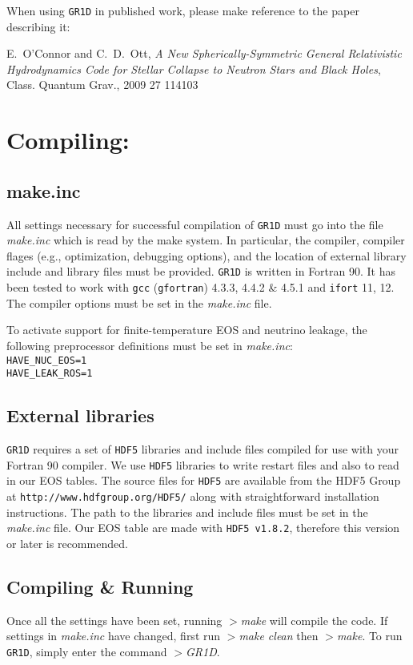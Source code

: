 \documentclass[10pt,nofootinbib]{article}
\newcommand{\code}[1]{\texttt{#1}}
\begin{document}
When using \code{GR1D} in published work, please make reference
to the paper describing it:

\hspace{2cm}\parbox{12cm}{E.\ O'Connor and C.\ D.\ Ott, \emph{A New Spherically-Symmetric
General Relativistic Hydrodynamics Code for Stellar Collapse to Neutron
Stars and Black Holes}, Class. Quantum Grav., 2009 27 114103}

\section{Compiling:}
\subsection{make.inc}
All settings necessary for successful compilation of \code{GR1D} must
go into the file {\emph{make.inc}} which is read by the make
system. In particular, the compiler, compiler flages (e.g.,
optimization, debugging options), and the location of external library
include and library files must be provided. \code{GR1D} is written in
Fortran 90. It has been tested to work with \code{gcc}
(\code{gfortran}) 4.3.3, 4.4.2 \& 4.5.1 and \code{ifort} 11, 12.  The compiler
options must be set in the {\it make.inc} file.

To activate support for finite-temperature EOS and neutrino leakage,
the following preprocessor definitions must be set in \emph{make.inc}:\\
{\tt HAVE\_NUC\_EOS=1}\\
{\tt HAVE\_LEAK\_ROS=1}

\subsection{External libraries}
\code{GR1D} requires a set of \code{HDF5} libraries and include files
compiled for use with your Fortran 90 compiler.  We use
\code{HDF5} libraries to write restart files and also to read in our
EOS tables.  The source files for \code{HDF5} are available from the
HDF5 Group at {\tt http://www.hdfgroup.org/HDF5/} along with
straightforward installation instructions.  The path to the libraries
and include files must be set in the {\it make.inc} file.  Our EOS
table are made with \code{HDF5 v1.8.2}, therefore this version or later
is recommended.

\subsection{Compiling \& Running}
Once all the settings have been set, running {\emph{$>$make}} will compile
the code.  If settings in {\emph{make.inc}} have changed, first run
{\emph{$>$make clean}} then {\emph{$>$make}}.  To run \code{GR1D},
simply enter the command {\emph{$>$GR1D}}.
\end{document}
